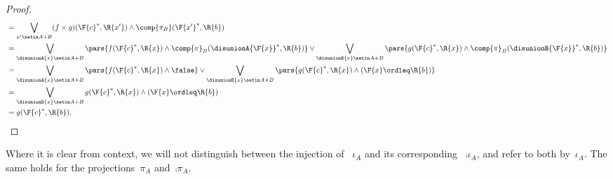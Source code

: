 \begin{proof}
\begin{equation}
\begin{aligned}
             & =\bigvee_{x'\setin A+B} (f\times g)(\F{c}^*,\R{x'}) \wedge \comp{\pi_B}(\F{x'}^*,\R{b}) \\
             & =\bigvee_{\disunionA{x}\setin A+B}\pars{ f(\F{c}^*,\R{x}) \wedge \comp{\pi}_B(\disunionA{\F{x}}^*,\R{b})} \vee
            \bigvee_{\disunionB{x}\setin A+B}\pars{ g(\F{c}^*,\R{x}) \wedge \comp{\pi}_B(\disunionB{\F{x}}^*,\R{b})} \\
             & =\bigvee_{\disunionA{x}\setin A+B}\pars{ f(\F{c}^*,\R{x}) \wedge \false } \vee
            \bigvee_{\disunionB{x}\setin A+B}\pars{ g(\F{c}^*,\R{x}) \wedge (\F{x}\ordleq \R{b}) } \\
             & =\bigvee_{\disunionB{x}\setin A+B} g(\F{c}^*,\R{x}) \wedge (\F{x}\ordleq \R{b}) \\
             & =g(\F{c}^*,\R{b}).
        \end{aligned}
    \end{equation}
\end{proof}

\begin{remark}
    Where it is clear from context, we will not distinguish between the injection of ~$\iota_A$ and its corresponding ~$\comp{\iota_A}$, and refer to both by~$\iota_A$.
    The same holds for the projections~$\pi_A$ and~$\comp{\pi_A}$.
\end{remark}

